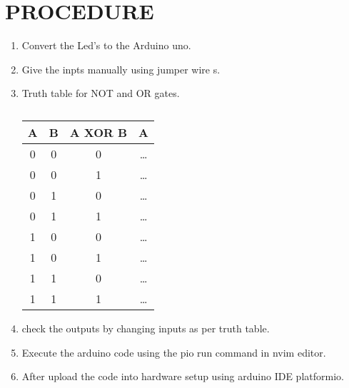 \documentclass[conference]{IEEEtran}
\begin{document}
\section{PROCEDURE}
\begin{enumerate}
     \item Convert the Led's to the Arduino uno. 
     \item Give the inpts manually using jumper wire    s.       \item Truth table for NOT and OR gates.   
     \begin{table}[htbp] 
             \centering
	      \begin{tabular}{|c|c|c|c|}                              \hline                                                           A & B & A XOR B & A \\                      
	      \hline                                          
  0 & 0 & 0 & \ldots \\                                   
  0 & 0 & 1 & \ldots \\                             
  0 & 1 & 0 & \ldots \\
  0 & 1 & 1 & \ldots \\                                   
  1 & 0 & 0 & \ldots \\                                   
  1 & 0 & 1 & \ldots \\
 
 1 & 1 & 0 & \ldots \\                                 
 1 & 1 & 1 & \ldots \\                                  
 \hline                                                 
 \end{tabular}                                                                                                            \vspace{0.1cm}                                           
	     \caption{\label{tab:widget} }            
 \end{table}                                     
 \item check the outputs by changing inputs as per truth table.                                         
 \item Execute the arduino code using the pio run command in nvim editor.                                        
    \item After upload the code into hardware setup using arduino IDE platformio.                          
    \end{enumerate}                                         
\end{document}
